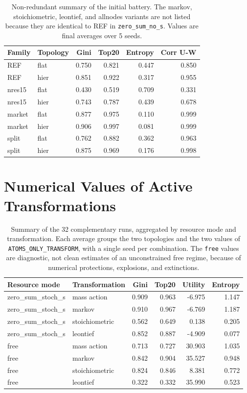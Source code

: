 \documentclass[11pt]{article}
\begin{document}
\begin{table}[H]
\centering
\scriptsize
\begin{tabular}{llrrrr}
\toprule
Family & Topology & Gini & Top20 & Entropy & Corr U-W \\
\midrule
REF & flat & 0.750 & 0.821 & 0.447 & 0.850 \\
REF & hier & 0.851 & 0.922 & 0.317 & 0.955 \\
nres15 & flat & 0.430 & 0.519 & 0.709 & 0.331 \\
nres15 & hier & 0.743 & 0.787 & 0.439 & 0.678 \\
market & flat & 0.877 & 0.975 & 0.110 & 0.999 \\
market & hier & 0.906 & 0.997 & 0.081 & 0.999 \\
split & flat & 0.762 & 0.882 & 0.362 & 0.963 \\
split & hier & 0.875 & 0.969 & 0.176 & 0.998 \\
\bottomrule
\end{tabular}
\caption{Non-redundant summary of the initial battery. The markov, stoichiometric, leontief, and allnodes variants are not listed because they are identical to REF in \texttt{zero\_sum\_no\_s}. Values are final averages over 5 seeds.}
\end{table}

\section{Numerical Values of Active Transformations}

\begin{table}[H]
\centering
\scriptsize
\begin{tabular}{llrrrr}
\toprule
Resource mode & Transformation & Gini & Top20 & Utility & Entropy \\
\midrule
zero\_sum\_stoch\_s & mass action & 0.909 & 0.963 & -6.975 & 1.147 \\
zero\_sum\_stoch\_s & markov & 0.910 & 0.967 & -6.769 & 1.187 \\
zero\_sum\_stoch\_s & stoichiometric & 0.562 & 0.649 & 0.138 & 0.205 \\
zero\_sum\_stoch\_s & leontief & 0.852 & 0.887 & -4.909 & 0.077 \\
free & mass action & 0.713 & 0.727 & 30.903 & 1.035 \\
free & markov & 0.842 & 0.904 & 35.527 & 0.948 \\
free & stoichiometric & 0.824 & 0.846 & 8.381 & 0.772 \\
free & leontief & 0.322 & 0.332 & 35.990 & 0.523 \\
\bottomrule
\end{tabular}
\caption{Summary of the 32 complementary runs, aggregated by resource mode and transformation. Each average groups the two topologies and the two values of \texttt{ATOMS\_ONLY\_TRANSFORM}, with a single seed per combination. The \texttt{free} values are diagnostic, not clean estimates of an unconstrained free regime, because of numerical protections, explosions, and extinctions.}
\end{table}
\end{document}
